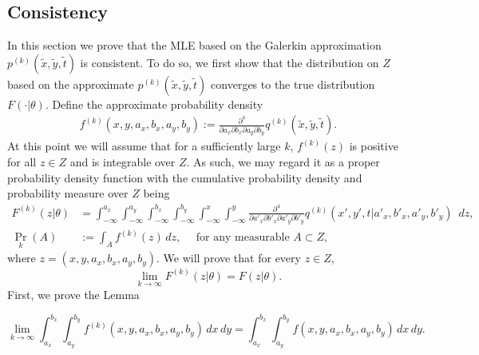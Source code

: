 \subsection{Consistency}
In this section we prove that the MLE based on the Galerkin
approximation $p^{(k)}(\tilde{x},\tilde{y},\tilde{t})$ is
consistent. To do so, we first show that the distribution on $Z$ based
on the approximate $p^{(k)}(\tilde{x},\tilde{y},\tilde{t})$ converges
to the true distribution $F(\cdot | \theta)$. Define the approximate probability
density
\begin{align}
  f^{(k)}(x,y,a_x,b_x,a_y,b_y) := \frac{\partial^4}{\partial
  a_x \partial b_x \partial a_y \partial b_y}
  q^{(k)}(\tilde{x},\tilde{y},\tilde{t}). \label{eq:galerkin-density}
\end{align}
At this point we will assume that for a sufficiently large $k$,
$f^{(k)}(z)$ is positive for all $z \in Z$ and is integrable over
$Z$. As such, we may regard it as a proper probability density
function with the cumulative probability density and probability
measure over $Z$ being
\begin{align}
  F^{(k)}(z | \theta) &= \displaystyle \int_{-\infty}^{a_x} \displaystyle \int_{-\infty}^{a_y} \displaystyle \int_{-\infty}^{b_x} \displaystyle \int_{-\infty}^{b_y} \displaystyle \int_{-\infty}^x \displaystyle \int_{-\infty}^y \frac{\partial^4}{\partial a'_x \partial b'_x \partial a'_y \partial b'_y} q^{(k)}(x', y', t | a'_x, b'_x, a'_y, b'_y)\,\,\, dz, \label{eq:approx-measure} \\
                          \Pr_{k}(A) &:= \displaystyle \int_{A} f^{(k)}(z)\, dz, \quad \mbox{ for any measurable } A \subset Z, \label{eq:approx-measure-2}
\end{align}
where $z = (x,y,a_x,b_x,a_y,b_y)$.  We will prove that for every
$z \in Z$,
\[
  \lim_{k\to \infty} F^{(k)}(z | \theta) = F(z | \theta).
\]
First, we prove the Lemma
\begin{lemma}\label{lem:1}
  \[
    \lim_{k\to \infty} \displaystyle \int_{a_x}^{b_x} \displaystyle
    \int_{a_y}^{b_y} f^{(k)}(x,y,a_x,b_x,a_y,b_y)\, dx\,dy =
    \displaystyle \int_{a_x}^{b_x} \displaystyle \int_{a_y}^{b_y}
    f(x,y,a_x,b_x,a_y,b_y)\, dx\,dy.
  \]
\end{lemma}
